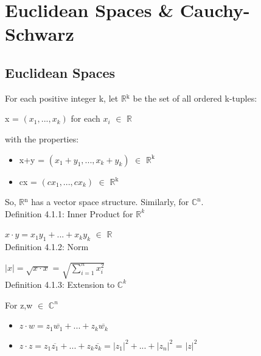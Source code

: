 \newpage
\section[Day 4: Euclidean Spaces \& Cauchy-Schwarz]
{Euclidean Spaces \& Cauchy-Schwarz}





\subsection{Euclidean Spaces}

	For each positive integer k, let $\mathbb{R}$$^\text{k}$ be the set of all ordered k-tuples:

	\qquad x = $(x_1,...,x_k)$	\qquad \qquad for each $x_i$ $\in$ $\mathbb{R}$

	with the properties:
	\begin{itemize}[leftmargin=1cm, itemsep=0.1cm]
		\item x+y = $(x_1+y_1,...,x_k+y_k)$ $\in$ $\mathbb{R}^{\text{k}}$
	
		\item cx = $(cx_1,...,cx_k)$ $\in$ $\mathbb{R}$$^\text{k}$
	\end{itemize}

	So, $\mathbb{R}$$^\text{n}$ has a vector space structure. Similarly, for $\mathbb{C}^{\text{n}}$. \\


{ \color{blue} Definition 4.1.1: Inner Product for $\mathbb{R}^k$} 

	\qquad $x \cdot y = x_1y_1 + ... + x_ky_k$ $\in$ $\mathbb{R}$ \\

{ \color{blue} Definition 4.1.2: Norm }

	\qquad $|x| = \sqrt{x \cdot x}$ = $\sqrt{\sum_{i=1}^n x_i^2}$ \\

{ \color{blue} Definition 4.1.3: Extension to $\mathbb{C}^k$ } 

	\qquad For z,w $\in$ $\mathbb{C}^n$
	\begin{itemize}[leftmargin=2cm, itemsep=0.1cm]
		\item $z \cdot w = z_1\overline{w_1} + ... + z_k\overline{w_k}$
	
		\item $z \cdot z = z_1\overline{z_1} + ... + z_k\overline{z_k}
			= |z_1|^2 + ... + |z_n|^2$ = $|z|^2$
	\end{itemize}





